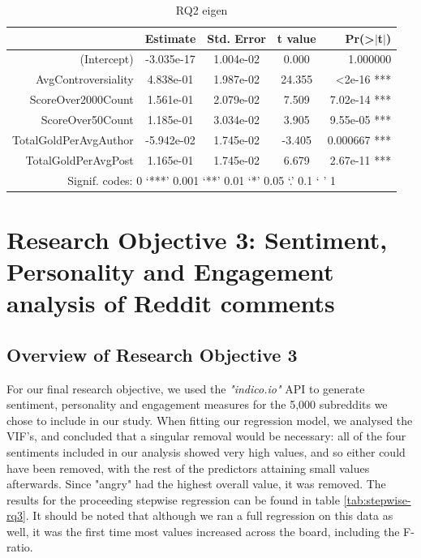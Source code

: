 \documentclass[bsc,frontabs,twoside,singlespacing,parskip,deptreport]{infthesis}
\begin{document}
\begin{table}[]
\centering
\caption{RQ2 eigen}
\label{tab:rq2-eigen}
\begin{tabular}{rcccr}
\hline
                      & Estimate   & Std. Error & t value & Pr(\textgreater{}$\rvert$t$\rvert$) \\ \hline
(Intercept)           & -3.035e-17 & 1.004e-02  & 0.000   & 1.000000                            \\
AvgControversiality   & 4.838e-01  & 1.987e-02  & 24.355  & \textless 2e-16 ***                 \\
ScoreOver2000Count    & 1.561e-01  & 2.079e-02  & 7.509   & 7.02e-14 ***                        \\
ScoreOver50Count      & 1.185e-01  & 3.034e-02  & 3.905   & 9.55e-05 ***                        \\
TotalGoldPerAvgAuthor & -5.942e-02 & 1.745e-02  & -3.405  & 0.000667 ***                        \\
TotalGoldPerAvgPost   & 1.165e-01  & 1.745e-02  & 6.679   & 2.67e-11 ***                        \\ \hline
\multicolumn{5}{c}{Signif. codes:  0 ‘***’ 0.001 ‘**’ 0.01 ‘*’ 0.05 ‘.’ 0.1 ‘ ’ 1}              \\ \hline
\end{tabular}
\end{table}


\chapter{Research Objective 3: Sentiment, Personality and Engagement analysis of Reddit comments}\label{content-analysis-results}

\section{Overview of Research Objective 3}

For our final research objective, we used the \textit{"indico.io"} API to generate sentiment, personality and engagement measures for the 5,000 subreddits we chose to include in our study. When fitting our regression model, we analysed the VIF's, and concluded that a singular removal would be necessary: all of the four sentiments included in our analysis showed very high values, and so either could have been removed, with the rest of the predictors attaining small values afterwards. Since "angry" had the highest overall value, it was removed. The results for the proceeding stepwise regression can be found in table \ref{tab:stepwise-rq3}. It should be noted that although we ran a full regression on this data as well, it was the first time most values increased across the board, including the F-ratio.
\end{document}
